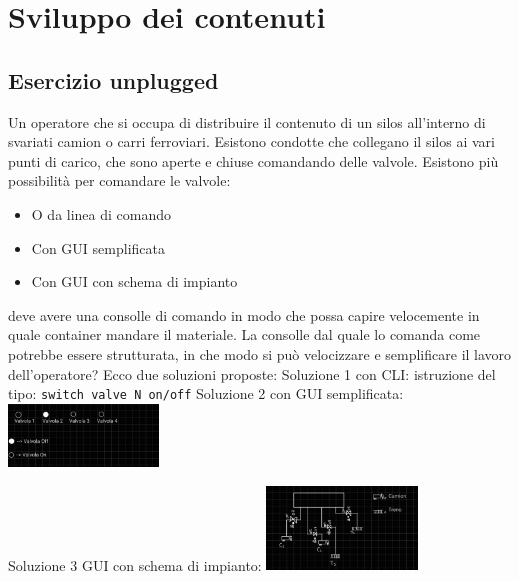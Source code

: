 \section{Sviluppo dei contenuti}

\subsection{Esercizio unplugged}
Un operatore che si occupa di distribuire il contenuto di  un silos all'interno di svariati camion o carri ferroviari. Esistono condotte che collegano il silos ai vari punti di carico, che sono aperte e chiuse comandando delle valvole. 
Esistono più possibilità per comandare le valvole:
\begin{itemize}
\item O da linea di comando 
\item  Con GUI semplificata
\item Con GUI con schema di impianto

\end{itemize}
deve avere una consolle di comando in modo che possa capire velocemente in quale container mandare il materiale.
La consolle dal quale lo comanda come potrebbe essere strutturata, in che modo si può velocizzare e semplificare il lavoro dell'operatore?
Ecco due soluzioni proposte:
Soluzione  1 con CLI: istruzione del tipo: \texttt{switch valve N on/off} \newline
Soluzione 2 con GUI semplificata:
  \includegraphics[width=0.3\textwidth]{img/gui_sempl.png}


Soluzione 3 GUI con schema di impianto:
  \includegraphics[width=0.3\textwidth]{img/gui_con_schema.png}


